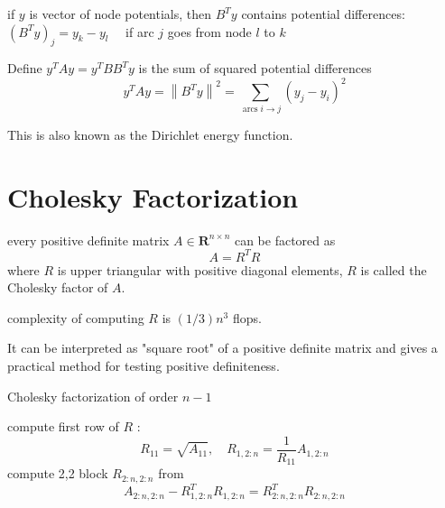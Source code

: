 \begin{theorem}
    if $ y $ is vector of node potentials, then $ B^{T} y $ contains potential differences:
$ \left(B^{T} y\right)_{j}=y_{k}-y_{l} \quad $ if arc $ j $ goes from node $ l $ to $ k $
\end{theorem}

\begin{theorem}
    Define $ y^{T} A y=y^{T} B B^{T} y $ is the sum of squared potential differences
$$
y^{T} A y=\left\|B^{T} y\right\|^{2}=\sum_{\operatorname{arcs} i \rightarrow j}\left(y_{j}-y_{i}\right)^{2}
$$

This is also known as the Dirichlet energy function.
\end{theorem}

\section{Cholesky Factorization}

\begin{theorem}
    every positive definite matrix $ A \in \mathbf{R}^{n \times n} $ can be factored as
$$
A=R^{T} R
$$
where $ R $ is upper triangular with positive diagonal elements, $ R $ is called the Cholesky factor of $ A $.
\end{theorem}

complexity of computing $ R $ is $ (1 / 3) n^{3} $ flops.

It can be interpreted as "square root" of a positive definite matrix and gives a practical method for testing positive definiteness.

\begin{algorithm}
    \caption{Cholesky factorization of order $ n-1 $}
    \KwIn{$$ \begin{aligned}\left[\begin{array}{cc}A_{11} & A_{1,2: n} \\ A_{2: n, 1} & A_{2: n, 2: n}\end{array}\right] &=\left[\begin{array}{cc}R_{11} & 0 \\ R_{1,2: n}^{T} & R_{2: n, 2: n}^{T}\end{array}\right]\left[\begin{array}{cc}R_{11} & R_{1,2: n} \\ 0 & R_{2: n, 2: n}\end{array}\right] \\ &=\left[\begin{array}{cc}R_{11}^{2} & R_{11} R_{1,2: n} \\ R_{11} R_{1,2: n}^{T} & R_{1,2: n}^{T} R_{1,2: n}+R_{2: n, 2: n}^{T} R_{2: n, 2: n}\end{array}\right] \end{aligned} $$}
    
compute first row of $ R $ :
$$
R_{11}=\sqrt{A_{11}}, \quad R_{1,2: n}=\frac{1}{R_{11}} A_{1,2: n}
$$\;
compute 2,2 block $ R_{2: n, 2: n} $ from
$$
A_{2: n, 2: n}-R_{1,2: n}^{T} R_{1,2: n}=R_{2: n, 2: n}^{T} R_{2: n, 2: n}
$$

\end{algorithm}

